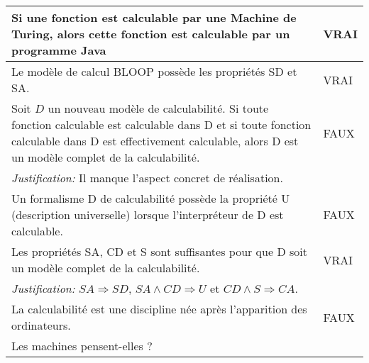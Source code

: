 \begin{tabular}{p{13cm}|l}
    Si une fonction est calculable par une Machine de Turing, alors cette fonction est calculable par un programme Java& VRAI \\
    \hline
    Le modèle de calcul BLOOP possède les propriétés SD et SA.& VRAI \\
    \hline
    Soit $D$ un nouveau modèle de calculabilité. Si toute fonction calculable est calculable dans D et si toute fonction calculable dans D est effectivement calculable, alors D est un modèle complet de la calculabilité.& FAUX\\
    \textit{Justification:} Il manque l'aspect concret de réalisation. & \\
    \hline
    Un formalisme D de calculabilité possède la propriété U (description universelle) lorsque l'interpréteur de D est calculable.& FAUX \\
    \hline
    Les propriétés SA, CD et S sont suffisantes pour que D soit un modèle complet de la calculabilité. & VRAI \\
    \textit{Justification:} $SA \Rightarrow SD$, $SA \land CD \Rightarrow U$ et $CD \land S \Rightarrow CA$. & \\
    \hline
    La calculabilité est une discipline née après l'apparition des ordinateurs. & FAUX \\
    \hline
    Les machines pensent-elles ?& \\
    \hline
\end{tabular}